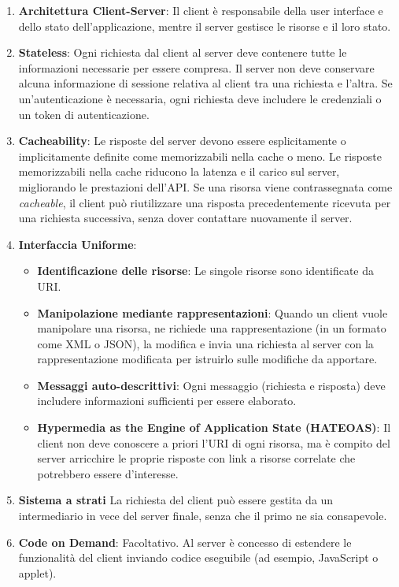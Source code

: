 \begin{enumerate}
  \item \textbf{Architettura Client-Server}: Il client è responsabile della user interface e dello stato dell'applicazione, mentre il server gestisce le risorse e il loro stato.
	\item \textbf{Stateless}: Ogni richiesta dal client al server deve contenere tutte le informazioni necessarie per essere compresa. Il server non deve conservare alcuna informazione di sessione relativa al client tra una richiesta e l'altra. Se un'autenticazione è necessaria, ogni richiesta deve includere le credenziali o un token di autenticazione.
	\item \textbf{Cacheability}: Le risposte del server devono essere esplicitamente o implicitamente definite come memorizzabili nella cache o meno. Le risposte memorizzabili nella cache riducono la latenza e il carico sul server, migliorando le prestazioni dell'API. Se una risorsa viene contrassegnata come \emph{cacheable}, il client può riutilizzare una risposta precedentemente ricevuta per una richiesta successiva, senza dover contattare nuovamente il server.
	\item \textbf{Interfaccia Uniforme}:
	\begin{itemize}
		\item \textbf{Identificazione delle risorse}: Le singole risorse sono identificate da URI.
		\item \textbf{Manipolazione mediante rappresentazioni}: Quando un client vuole manipolare una risorsa, ne richiede una rappresentazione (in un formato come XML o JSON), la modifica e invia una richiesta al server con la rappresentazione modificata per istruirlo sulle modifiche da apportare.
		\item \textbf{Messaggi auto-descrittivi}: Ogni messaggio (richiesta e risposta) deve includere informazioni sufficienti per essere elaborato.
		\item \textbf{Hypermedia as the Engine of Application State (HATEOAS)}: Il client non deve conoscere a priori l'URI di ogni risorsa, ma è compito del server arricchire le proprie risposte con link a risorse correlate che potrebbero essere d'interesse.
	\end{itemize}
	\item \textbf{Sistema a strati} La richiesta del client può essere gestita da un intermediario in vece del server finale, senza che il primo ne sia consapevole.
	\item \textbf{Code on Demand}: Facoltativo. Al server è concesso di estendere le funzionalità del client inviando codice eseguibile (ad esempio, JavaScript o applet).
\end{enumerate}

